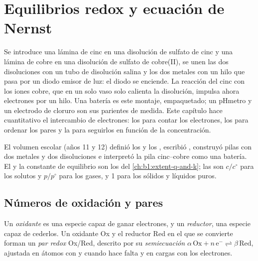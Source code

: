 \chapter{Equilibrios redox y ecuación de Nernst}\label{ch:b1:nernst}

Se introduce una lámina de cinc en una disolución de sulfato de cinc y
una lámina de cobre en una disolución de sulfato de cobre(II), se unen
las dos disoluciones con un tubo de disolución salina y los dos metales
con un hilo que pasa por un diodo emisor de luz: el diodo se enciende. La
reacción del cinc con los iones cobre, que en un solo vaso solo calienta
la disolución, impulsa ahora electrones por un hilo. Una batería es este
montaje, empaquetado; un pHmetro y un electrodo de cloruro son sus
parientes de medida. Este capítulo hace cuantitativo el intercambio de
electrones: los  para contar los electrones, los
 para ordenar los pares y la 
para seguirlos en función de la concentración.

\begin{recall}
El volumen escolar (años 11 y 12) definió los  y los ,
escribió , construyó pilas con dos metales y dos
disoluciones e interpretó la pila cinc--cobre como una batería. El
 y la constante de equilibrio son los del
\cref{ch:b1:extent-q-and-k}; las  son $c/c^\circ$ para los
solutos y $p/p^\circ$ para los gases, y 1 para los sólidos y líquidos
puros.
\end{recall}

\section{Números de oxidación y pares}

\begin{definition}\label{def:b1:nernst:couple}
Un \emph{oxidante} es una especie capaz de ganar
electrones, y un \emph{reductor}, una especie capaz de
cederlos. Un oxidante Ox y el reductor Red en el que se convierte forman
un \emph{par redox} Ox/Red, descrito por su
\emph{semiecuación}
$\alpha\,\mathrm{Ox} + n\,\mathrm{e^-} \rightleftharpoons
\beta\,\mathrm{Red}$, ajustada en átomos con  y  cuando
hace falta y en cargas con los electrones.
\end{definition}

